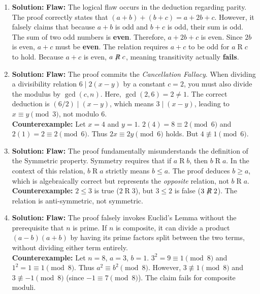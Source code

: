 \documentclass[11pt, a4paper]{article}
\theoremstyle{definition}
\theoremstyle{remark}
\begin{document}
\begin{enumerate}[label=\textbf{\arabic*.}]
    \item \textbf{Solution:}
    \textbf{Flaw:} The logical flaw occurs in the deduction regarding parity. The proof correctly states that $(a+b) + (b+c) = a + 2b + c$. However, it falsely claims that because $a+b$ is odd and $b+c$ is odd, their sum is odd. The sum of two odd numbers is \textbf{even}. Therefore, $a + 2b + c$ is even. Since $2b$ is even, $a+c$ must be \textbf{even}. The relation requires $a+c$ to be odd for $a \mathrel{R} c$ to hold. Because $a+c$ is even, $a \not\mathrel{R} c$, meaning transitivity actually \textbf{fails}.

    \item \textbf{Solution:}
    \textbf{Flaw:} The proof commits the \textit{Cancellation Fallacy}. When dividing a divisibility relation $6 \mid 2(x-y)$ by a constant $c=2$, you must also divide the modulus by $\gcd(c, n)$. Here, $\gcd(2, 6) = 2 \neq 1$. The correct deduction is $(6/2) \mid (x-y)$, which means $3 \mid (x-y)$, leading to $x \equiv y \pmod{3}$, not modulo 6. \\
    \textbf{Counterexample:} Let $x = 4$ and $y = 1$. $2(4) = 8 \equiv 2 \pmod{6}$ and $2(1) = 2 \equiv 2 \pmod{6}$. Thus $2x \equiv 2y \pmod{6}$ holds. But $4 \not\equiv 1 \pmod{6}$.

    \item \textbf{Solution:}
    \textbf{Flaw:} The proof fundamentally misunderstands the definition of the Symmetric property. Symmetry requires that if $a \mathrel{R} b$, then $b \mathrel{R} a$. In the context of this relation, $b \mathrel{R} a$ strictly means $b \le a$. The proof deduces $b \ge a$, which is algebraically correct but represents the \textit{opposite} relation, not $b \mathrel{R} a$. \\
    \textbf{Counterexample:} $2 \le 3$ is true ($2 \mathrel{R} 3$), but $3 \le 2$ is false ($3 \not\mathrel{R} 2$). The relation is anti-symmetric, not symmetric.

    \item \textbf{Solution:}
    \textbf{Flaw:} The proof falsely invokes Euclid's Lemma without the prerequisite that $n$ is prime. If $n$ is composite, it can divide a product $(a-b)(a+b)$ by having its prime factors split between the two terms, without dividing either term entirely.\\
    \textbf{Counterexample:} Let $n = 8$, $a = 3$, $b = 1$. $3^2 = 9 \equiv 1 \pmod{8}$ and $1^2 = 1 \equiv 1 \pmod{8}$. Thus $a^2 \equiv b^2 \pmod{8}$. However, $3 \not\equiv 1 \pmod{8}$ and $3 \not\equiv -1 \pmod{8}$ (since $-1 \equiv 7 \pmod{8}$). The claim fails for composite moduli.

\end{enumerate}
\end{document}
